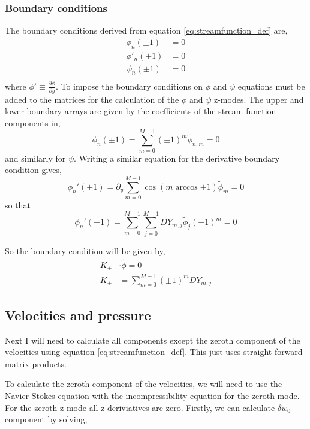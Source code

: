 \documentclass[12pt,a4paper]{article}
\newcommand{\sw}{\delta w}
\newcommand{\dd}[1]{\partial_{#1}}
\begin{document}
\subsubsection{Boundary conditions}

The boundary conditions derived from equation \ref{eq:streamfunction_def} are,
\begin{align}
     \phi_{n} \left( \pm 1 \right)  &= 0 \\ 
    \phi'_{n} \left( \pm 1 \right)  &= 0 \\
    \psi _{n} \left( \pm 1 \right)  &= 0 \\
\end{align}
where $\phi' \equiv \frac{\partial \phi}{ \partial y}$. To impose the boundary conditions on $\phi$ and $\psi$ equations must be added to the matrices for the calculation of the $\phi$ and $\psi$ z-modes. The upper and lower boundary arrays are given by the coefficients of the stream function components in,
\begin{equation}
    \phi_{n}(\pm 1) = \sum\limits_{m=0}^{M-1} (\pm1)^{m}\widetilde{\phi}_{n,m} = 0
\end{equation}
and similarly for $\psi$. Writing a similar equation for the derivative boundary condition gives,
\begin{equation}
    \phi_{n}'(\pm 1) = \dd{y} \sum\limits_{m=0}^{M-1} \cos{\left(m\arccos{\pm 1} \right)}\widetilde{\phi}_{m} = 0
\end{equation}
so that
\begin{equation}
    \phi_{n}'(\pm 1) = \sum\limits_{m=0}^{M-1} \sum\limits_{j=0}^{M-1} DY_{m,j}\widetilde{\phi}_{j} (\pm1)^{m} = 0
\end{equation}

So the boundary condition will be given by,
\begin{align}
    K_{\pm}& \cdot \widetilde{\phi} = 0 \\
    K_{\pm}& = \sum\limits_{m=0}^{M-1} (\pm1)^m DY_{m,j}  
\end{align}

\subsection{Velocities and pressure}

Next I will need to calculate all components except the zeroth component of the velocities using equation \ref{eq:streamfunction_def}. This just uses straight forward matrix products.

To calculate the zeroth component of the velocities, we will need to use the Navier-Stokes equation with the incompressibility equation for the zeroth mode. For the zeroth z mode all z deriviatives are zero. Firstly, we can calculate $\sw_{0}$ component by solving,
\end{document}
